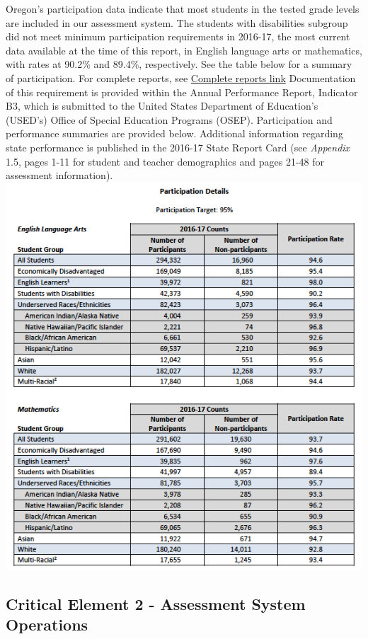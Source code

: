 \documentclass[]{article}
\begin{document}
Oregon's participation data indicate that most students in the tested
grade levels are included in our assessment system. The students with
disabilities subgroup did not meet minimum participation requirements in
2016-17, the most current data available at the time of this report, in
English language arts or mathematics, with rates at 90.2\% and 89.4\%,
respectively. See the table below for a summary of participation. For
complete reports, see \color{link}
\href{http://www.oregon.gov/ode/schools-and-districts/reportcards/Documents/rptcard2017.pdf}{Complete
reports link} \color{black} Documentation of this requirement is
provided within the Annual Performance Report, Indicator B3, which is
submitted to the United States Department of Education's (USED's) Office
of Special Education Programs (OSEP). Participation and performance
summaries are provided below. Additional information regarding state
performance is published in the 2016-17 State Report Card (see
\emph{Appendix} 1.5, pages 1-11 for student and teacher demographics and
pages 21-48 for assessment information).\FloatBarrier
\includegraphics{Figures/Participation/Participation.png}

\subsection{Critical Element 2 - Assessment System
Operations}\label{critical-element-2---assessment-system-operations}
\end{document}
